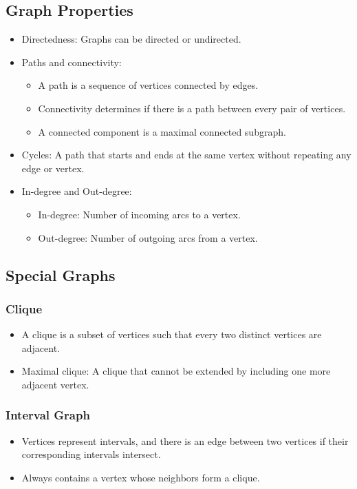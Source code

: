 \documentclass[8pt]{article}
\begin{document}
\subsection{Graph Properties}
\begin{itemize}
    \item Directedness: Graphs can be directed or undirected.
    \item Paths and connectivity:
    \begin{itemize}
        \item A path is a sequence of vertices connected by edges.
        \item Connectivity determines if there is a path between every pair of vertices.
        \item A connected component is a maximal connected subgraph.
    \end{itemize}
    \item Cycles: A path that starts and ends at the same vertex without repeating any edge or vertex.
    \item In-degree and Out-degree:
    \begin{itemize}
        \item In-degree: Number of incoming arcs to a vertex.
        \item Out-degree: Number of outgoing arcs from a vertex.
    \end{itemize}
\end{itemize}

\subsection{Special Graphs}
\subsubsection{Clique}
\begin{itemize}
    \item A clique is a subset of vertices such that every two distinct vertices are adjacent.
    \item Maximal clique: A clique that cannot be extended by including one more adjacent vertex.
\end{itemize}

\subsubsection{Interval Graph}
\begin{itemize}
    \item Vertices represent intervals, and there is an edge between two vertices if their corresponding intervals intersect.
    \item Always contains a vertex whose neighbors form a clique.
\end{itemize}
\end{document}

